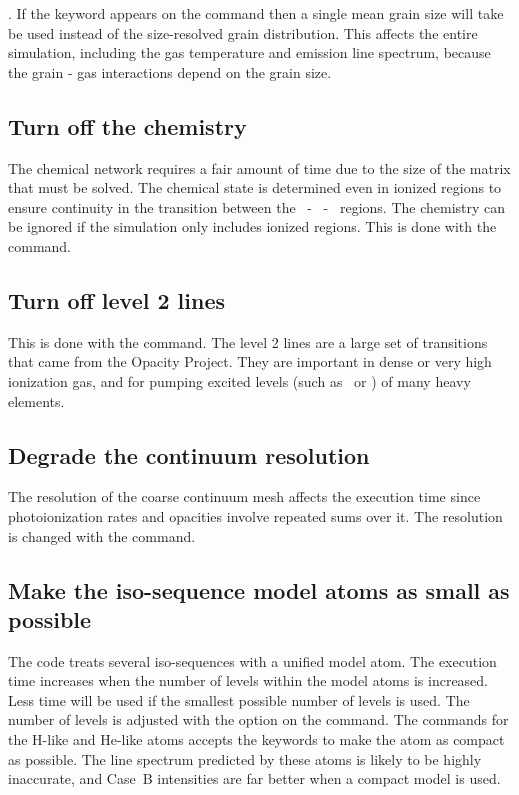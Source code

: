 .
If the  keyword appears
on the  command then a single mean grain size
will take be used instead
of the size-resolved grain distribution.
This affects the entire simulation,
including the gas temperature and emission line spectrum,
because the grain
- gas interactions depend on the grain size.

\subsection{Turn off the chemistry}

The chemical network requires a fair amount of time due to the size of
the matrix that must be solved.
The chemical state is determined even in
ionized regions to ensure continuity in the transition
between the \hplus\ - \hO\ - \htwo\ regions.
The chemistry can be ignored if the simulation only includes ionized regions.
This is done with the  command.

\subsection{Turn off level 2 lines}

This is done with the  command.
The level 2 lines are a large set of transitions that came
from the Opacity Project.
They are important in dense or very high
ionization gas,
and for pumping excited levels (such as \ci*\ or \cii*)
of many heavy elements.

\subsection{Degrade the continuum resolution }

The resolution of the coarse continuum mesh affects the execution time
since photoionization rates and opacities involve repeated sums over it.
The resolution is changed with the  command.

\subsection{Make the iso-sequence model atoms as small as possible}

The code treats several iso-sequences with a unified model atom.
The
execution time increases when the number of levels within the model atoms
is increased.
Less time will be used if the smallest possible number of
levels is used.
The number of levels is adjusted with the  option
on the  command.
The
 commands for the
H-like and He-like atoms accepts the keywords 
to make the atom
as compact as possible.
The line spectrum predicted by these atoms is likely
to be highly inaccurate,
and Case~B intensities are far better when a compact model is used.


